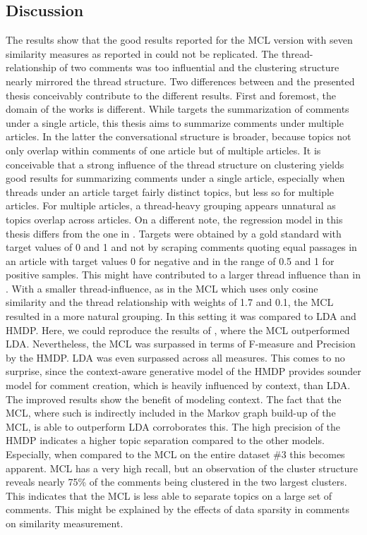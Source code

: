\subsection{Discussion}
The results show that the good results reported for the MCL version with seven similarity measures as reported in \cite{DBLP:conf/ecir/AkerKBPBHG16} could not be replicated. The thread-relationship of two comments was too influential and the clustering structure nearly mirrored the thread structure. Two differences between \cite{DBLP:conf/ecir/AkerKBPBHG16} and the presented thesis conceivably contribute to the different results. First and foremost, the domain of the works is different. While \cite{DBLP:conf/ecir/AkerKBPBHG16} targets the summarization of comments under a single article, this thesis aims to summarize comments under multiple articles. In the latter the conversational structure is broader, because topics not only overlap within comments of one article but of multiple articles. It is conceivable that a strong influence of the thread structure on clustering yields good results for summarizing comments under a single article, especially when threads under an article target fairly distinct topics, but less so for multiple articles. For multiple articles, a thread-heavy grouping appears unnatural as topics overlap across articles. On a different note, the regression model in this thesis differs from the one in \cite{DBLP:conf/ecir/AkerKBPBHG16}. Targets were obtained by a gold standard with target values of 0 and 1 and not by scraping comments quoting equal passages in an article with target values 0 for negative and in the range of 0.5 and 1 for positive samples. This might have contributed to a larger thread influence than in \cite{DBLP:conf/ecir/AkerKBPBHG16}. With a smaller thread-influence, as in the MCL which uses only cosine similarity and the thread relationship with weights of 1.7 and 0.1, the MCL resulted in a more natural grouping. In this setting it was compared to LDA and HMDP.
Here, we could reproduce the results of \cite{DBLP:conf/ecir/AkerKBPBHG16}, where the MCL outperformed LDA. Nevertheless, the MCL was surpassed in terms of F-measure and Precision by the HMDP. LDA was even surpassed across all measures. This comes to no surprise, since the context-aware generative model of the HMDP provides sounder model for comment creation, which is heavily influenced by context, than LDA. The improved results show the benefit of modeling context. The fact that the MCL, where such is indirectly included in the Markov graph build-up of the MCL, is able to outperform LDA corroborates this. The high precision of the HMDP indicates a higher topic separation compared to the other models. Especially, when compared to the MCL on the entire dataset \#3 this becomes apparent. MCL has a very high recall, but an observation of the cluster structure reveals nearly 75\% of the comments being clustered in the two largest clusters. This indicates that the MCL is less able to separate topics on a large set of comments. This might be explained by the effects of data sparsity in comments on similarity measurement. \par
